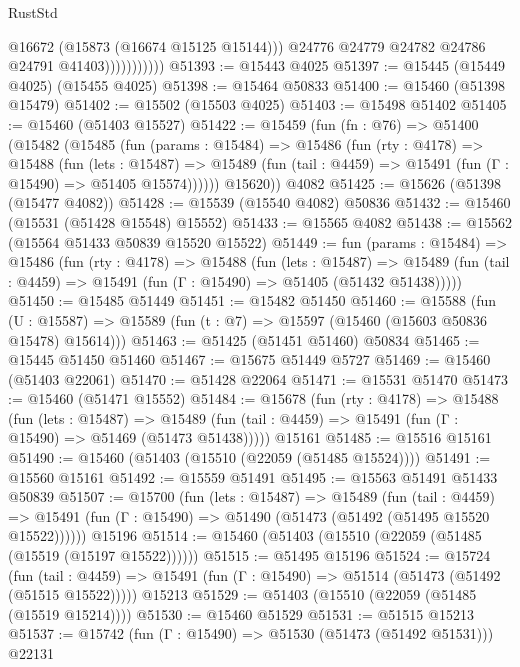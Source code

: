 \begin{lexlean}{RustStd}
\begin{coremodule}
                            @16672
                            (@15873 (@16674 @15125 @15144)))
                          @24776
                          @24779
                          @24782
                          @24786
                          @24791
                          @41403)))))))))))
@51393 := @15443 @4025
@51397 := @15445 (@15449 @4025) (@15455 @4025)
@51398 := @15464 @50833
@51400 := @15460 (@51398 @15479)
@51402 := @15502 (@15503 @4025)
@51403 := @15498 @51402
@51405 := @15460 (@51403 @15527)
@51422 := @15459
    (fun (fn : @76) =>
    @51400
      (@15482
        (@15485
          (fun (params : @15484) =>
          @15486
            (fun (rty : @4178) =>
            @15488
              (fun (lets : @15487) =>
              @15489 (fun (tail : @4459) => @15491 (fun (Γ : @15490) => @51405 @15574))))))
        @15620))
    @4082
@51425 := @15626 (@51398 (@15477 @4082))
@51428 := @15539 (@15540 @4082) @50836
@51432 := @15460 (@15531 (@51428 @15548) @15552)
@51433 := @15565 @4082
@51438 := @15562 (@15564 @51433 @50839 @15520 @15522)
@51449 := fun (params : @15484) =>
  @15486
    (fun (rty : @4178) =>
    @15488
      (fun (lets : @15487) =>
      @15489 (fun (tail : @4459) => @15491 (fun (Γ : @15490) => @51405 (@51432 @51438)))))
@51450 := @15485 @51449
@51451 := @15482 @51450
@51460 := @15588
    (fun (U : @15587) => @15589 (fun (t : @7) => @15597 (@15460 (@15603 @50836 @15478) @15614)))
@51463 := @51425 (@51451 @51460) @50834
@51465 := @15445 @51450 @51460
@51467 := @15675 @51449 @5727
@51469 := @15460 (@51403 @22061)
@51470 := @51428 @22064
@51471 := @15531 @51470
@51473 := @15460 (@51471 @15552)
@51484 := @15678
    (fun (rty : @4178) =>
    @15488
      (fun (lets : @15487) =>
      @15489 (fun (tail : @4459) => @15491 (fun (Γ : @15490) => @51469 (@51473 @51438)))))
    @15161
@51485 := @15516 @15161
@51490 := @15460 (@51403 (@15510 (@22059 (@51485 @15524))))
@51491 := @15560 @15161
@51492 := @15559 @51491
@51495 := @15563 @51491 @51433 @50839
@51507 := @15700
    (fun (lets : @15487) =>
    @15489
      (fun (tail : @4459) =>
      @15491 (fun (Γ : @15490) => @51490 (@51473 (@51492 (@51495 @15520 @15522))))))
    @15196
@51514 := @15460 (@51403 (@15510 (@22059 (@51485 (@15519 (@15197 @15522))))))
@51515 := @51495 @15196
@51524 := @15724
    (fun (tail : @4459) => @15491 (fun (Γ : @15490) => @51514 (@51473 (@51492 (@51515 @15522)))))
    @15213
@51529 := @51403 (@15510 (@22059 (@51485 (@15519 @15214))))
@51530 := @15460 @51529
@51531 := @51515 @15213
@51537 := @15742 (fun (Γ : @15490) => @51530 (@51473 (@51492 @51531))) @22131

\end{coremodule}
\end{lexlean}

